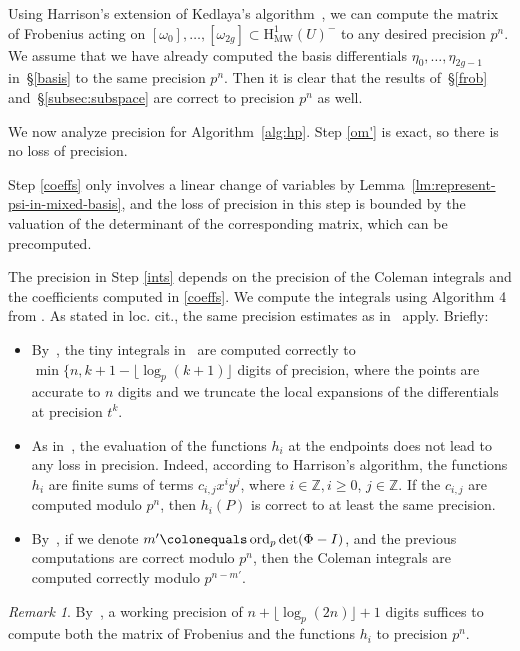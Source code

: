\documentclass[11pt, a4paper]{amsart}
\newcommand{\Z}{\mathbb{Z}}
\newcommand{\hmw}{\operatorname{H^1_{MW}}}
\newcommand{\ord}{\operatorname{ord}}
\theoremstyle{remark}
\newtheorem{remark}[theorem]{Remark}
\numberwithin{equation}{section}
\newcommand{\sg}{{}}
\newcommand{\sm}{{}}
\begin{document}
Using Harrison's extension of Kedlaya's algorithm~\cite{Harrison-Even-Deg-MW}, we can
compute the matrix of Frobenius acting on $[\omega_0],\ldots,[\omega_{2g}]\subset \hmw(U)^-$ to any desired precision $p^n$. We assume
that we have already computed the basis differentials
$\eta_0,\ldots,\eta_{2g-1}$ in~\S\ref{basis} to the same
precision $p^n$. Then it is clear that the results of~\S\ref{frob}
and~\S\ref{subsec:subspace} are correct to
precision $p^n$ as well. 

\sm{We now analyze precision for Algorithm}~\ref{alg:hp}.
Step \eqref{om'} is exact, so there is no loss of precision. 
\sg{
Step \eqref{coeffs} only involves a linear change of variables by Lemma~\ref{lm:represent-psi-in-mixed-basis}, and the loss of precision in this step is bounded by the valuation of the determinant of the corresponding matrix, which can be precomputed.


The precision in Step \eqref{ints} depends on the precision of the Coleman integrals and the coefficients computed in \eqref{coeffs}. We compute the integrals using Algorithm 4 from \cite{Jen-Even-Degree-CI}. As stated in loc. cit., the same precision estimates as in~\cite{BBK} apply. Briefly:
\begin{itemize}
\item[(a)] By~\cite[Proposition~18]{BBK}, the tiny integrals in~\cite[Equation~(3.2)]{Jen-Even-Degree-CI} are computed correctly to $\min\{n,k+1-\lfloor\log_p(k+1)\rfloor$ digits of precision, where the points are accurate to $n$ digits and we truncate the local expansions of the differentials at precision $t^k$.

\item[(b)] As in~\cite{BBK}, the evaluation of the functions $h_i$ at the
  endpoints does not lead to any loss in precision. Indeed, according to
    Harrison's algorithm, the functions $h_i$ are finite sums of terms
    $c_{i,j}x^iy^j$, where $i\in \Z, i\geq 0$, $j\in \Z$. If the $c_{i,j}$
    are computed modulo $p^n$, then $h_i(P)$ is correct to at least
    the same precision.
\item[(c)] By~\cite[Proposition~19]{BBK}, if we denote $m'\colonequals \ord_p\det(\Phi-I)$, and the previous computations are correct modulo $p^n$, then the Coleman integrals are computed correctly modulo $p^{n-m'}$.
\end{itemize}
\begin{remark}
    By~\cite[Section~3]{Harrison-Even-Deg-MW}, a working precision of $n+\lfloor\log_p(2n)\rfloor+1$ digits suffices to compute both the matrix of Frobenius and the functions $h_i$ to precision $p^n$.
\end{remark}

}
\end{document}
